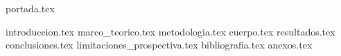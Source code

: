 \documentclass[a4paper,openany,oneside,12pt]{report}
\begin{document}
  {portada.tex}
  \tableofcontents
  \listoffigures 
  \listoftables 
  {introduccion.tex}
  {marco_teorico.tex}
  {metodologia.tex}
  {cuerpo.tex}
  {resultados.tex}
  {conclusiones.tex}
  {limitaciones_prospectiva.tex}
  {bibliografia.tex}
  {anexos.tex}
\end{document}
